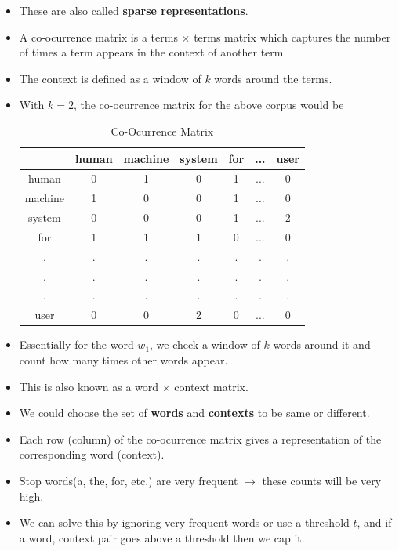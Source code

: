 \documentclass[a4paper]{article}
\begin{document}
\begin{itemize}
    \item These are also called \textbf{sparse representations}.
    \item A co-ocurrence matrix is a terms $\times$ terms matrix which captures the number of times a term appears in the context of another term
    \item The context is defined as a window of $k$ words around the terms.
    \item With $k=2$, the co-ocurrence matrix for the above corpus would be
    \begin{table}[H]
        \centering
        \begin{tabular}{|c|c|c|c|c|c|c|}
            \hline
             & human & machine & system & for & ... & user \\
             \hline
            human & 0 & 1 & 0 & 1 & ... & 0\\
            \hline
            machine & 1 & 0 & 0 & 1 & ... & 0\\
            \hline
            system & 0 & 0 & 0 & 1 & ... & 2\\
            \hline
            for & 1 & 1 & 1 & 0 & ... & 0\\
            \hline
            .&.&.&.&.&.&.\\
            \hline
            .&.&.&.&.&.&.\\
            \hline
            .&.&.&.&.&.&.\\
            \hline
            user & 0 & 0 & 2 & 0 & ... & 0\\
            \hline
        \end{tabular}
        \caption{Co-Ocurrence Matrix}
    \end{table}
    \item Essentially for the word $w_1$, we check a window of $k$ words around it and count how many times other words appear.
    \item This is also known as a word $\times$ context matrix.
    \item We could choose the set of \textbf{words} and \textbf{contexts} to be same or different.
    \item Each row (column) of the co-ocurrence matrix gives a representation of the corresponding word (context).
    \item Stop words(a, the, for, etc.) are very frequent $\to$ these counts will be very high.
    \item We can solve this by ignoring very frequent words or use a threshold $t$, and if a word, context pair goes above a threshold then we cap it.

\end{itemize}
\end{document}
